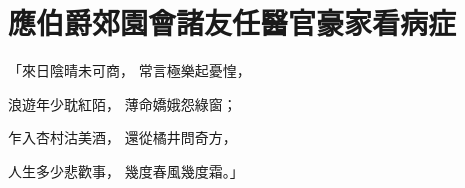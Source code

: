 %

\chapter{應伯爵郊園會諸友\KG 任醫官豪家看病症}


\begin{showcontents}{}



「來日陰晴未可商，  常言極樂起憂惶，

浪遊年少耽紅陌，  薄命嬌娥怨綠窗；

乍入杏村沽美酒，  還從橘井問奇方，

人生多少悲歡事，  幾度春風幾度霜。」


\end{showcontents}
